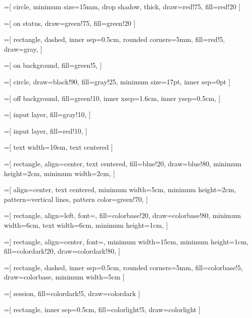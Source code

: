 \usetikzlibrary{arrows}
\usetikzlibrary{shapes}
\usetikzlibrary{automata}
\usetikzlibrary{backgrounds}
\usetikzlibrary{petri}
\usetikzlibrary{shadows}
\usetikzlibrary{fit}
\usetikzlibrary{positioning}
\usetikzlibrary{patterns}
\usetikzlibrary{decorations}
\usetikzlibrary{decorations.pathreplacing}


=[
	circle,
	minimum size=15mm,
	drop shadow,
	thick,
	draw=red!75,
	fill=red!20
]

=[
	on status,
	draw=green!75,
	fill=green!20
]

=[
	rectangle,
	dashed,
	inner sep=0.5cm,
	rounded corners=5mm,
	fill=red!5,
	draw=gray,
]

=[
	on background,
	fill=green!5,
]

=[
	circle,
	draw=black!90,
	fill=gray!25,
	minimum size=17pt,
	inner sep=0pt
]

=[
	off background,
	fill=green!10,
	inner xsep=1.6cm,
	inner ysep=0.5cm,
]

=[
	input layer,
	fill=gray!10,
]

=[
	input layer,
	fill=red!10,
]

=[
	text width=10em,
	text centered
]

=[
	rectangle,
	align=center,
	text centered,
	fill=blue!20,
	draw=blue!80,
	minimum height=2cm,
	minimum width=2cm,
]

=[
	align=center,
	text centered,
	minimum width=5cm,
	minimum height=2cm,
	pattern=vertical lines,
	pattern color=green!70,
]

=[
	rectangle,
	align=left,
	font=\ttfamily\small,
	fill=colorbase!20,
	draw=colorbase!80,
	minimum width=6cm,
	text width=6cm,
	minimum height=1cm,
]

=[
	rectangle,
	align=center,
	font=\ttfamily\small,
	minimum width=15cm,
	minimum height=1cm,
	fill=colordark!20,
	draw=colordark!80,
]

=[
	rectangle,
	dashed,
	inner sep=0.5cm,
	rounded corners=5mm,
	fill=colorbase!5,
	draw=colorbase,
	minimum width=5cm
]

=[
	session,
	fill=colordark!5,
	draw=colordark
]

=[
	rectangle,
	inner sep=0.5cm,
	fill=colorlight!5,
	draw=colorlight
]
